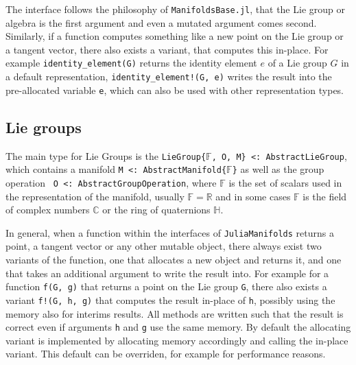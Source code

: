 \documentclass{juliacon}
\begin{document}
The interface follows the philosophy of \verb|ManifoldsBase.jl|, that the Lie group or algebra is the first argument and even a mutated argument comes second.
Similarly, if a function computes something like a new point on the Lie group or a tangent vector, there also exists a variant, that computes this in-place.
For example \verb|identity_element(G)| returns the identity element $e$ of a Lie group $G$ in a default representation, \verb|identity_element!(G, e)| writes the result into the pre-allocated variable \verb|e|, which can also be used with other representation types.

\subsection{Lie groups}

The main type for Lie Groups is the \verb|LieGroup{|$\mathbb {F}$\verb|, O, M} <: AbstractLieGroup|, which contains a manifold \verb|M <: AbstractManifold{|$\mathbb F$\verb|}| as well as the group operation \verb| O <: AbstractGroupOperation|, where $\mathbb {F}$ is the set of scalars used in the representation of the manifold, usually \(\mathbb {F} = \mathbb{R}\) and in some cases \(\mathbb {F}\) is the field of complex numbers \(\mathbb{C}\) or the ring of quaternions \(\mathbb H\).

In general, when a function within the interfaces of \verb|JuliaManifolds| returns a point, a tangent vector or any other mutable object, there always exist two variants of the function, one that allocates a new object and returns it, and one that takes an additional argument to write the result into. For example for a function \verb|f(G, g)| that returns a point on the Lie group \verb|G|, there also exists a variant \verb|f!(G, h, g)| that computes the result in-place of \verb|h|, possibly using the memory also for interims results. All methods are written such that the result is correct even if arguments \verb|h| and \verb|g| use the same memory. By default the allocating variant is implemented by allocating memory accordingly and calling the in-place variant. This default can be overriden, for example for performance reasons.
\end{document}
